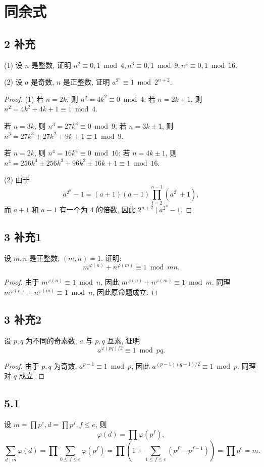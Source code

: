 \documentclass[12pt,a4paper,reqno]{amsart}
\theoremstyle{remark}
\renewcommand{\le}{\leqslant}
\begin{document}
\section{同余式}

\subsection*{2 补充}
(1) 设 $n$ 是整数, 证明 $n^2\equiv 0,1\bmod 4, n^3\equiv 0,1\bmod 9, n^4\equiv 0,1\bmod{16}$.

(2) 设 $a$ 是奇数, $n$ 是正整数, 证明 $a^{2^n}\equiv 1\bmod{2^{n+2}}$.
\begin{proof}
(1) 若 $n=2k$, 则 $n^2=4k^2\equiv 0\bmod 4$; 若 $n=2k+1$, 则 $n^2=4k^2+4k+1\equiv1\bmod 4$.

若 $n=3k$, 则 $n^3=27k^3\equiv0\bmod 9$; 若 $n=3k\pm 1$, 则 $n^3=27k^3\pm27k^2+9k\pm1\equiv 1\bmod9$.

若 $n=2k$, 则 $n^4=16k^4\equiv 0\bmod {16}$; 若 $n=4k\pm1$, 则 $n^4=256k^4\pm 256k^3+96k^2\pm 16k+1\equiv 1\bmod{16}$.

(2) 由于
  \[a^{2^n}-1=(a+1)(a-1)\prod_{i=2}^{n-1}(a^{2^i}+1),\]
而 $a+1$ 和 $a-1$ 有一个为 $4$ 的倍数, 因此 $2^{n+2}\mid a^{2^n}-1$.
\end{proof}

\subsection*{3 补充1}
设 $m,n$ 是正整数, $(m,n)=1$. 证明:
\[m^{\varphi(n)}+n^{\varphi(m)}\equiv1\bmod {mn}.\]
\begin{proof}
由于 $m^{\varphi(n)}\equiv1 \bmod n$, 因此 $m^{\varphi(n)}+n^{\varphi(m)}\equiv1\bmod m$. 同理 $m^{\varphi(n)}+n^{\varphi(m)}\equiv1\bmod n$, 因此原命题成立.
\end{proof}

\subsection*{3 补充2}
设 $p,q$ 为不同的奇素数, $a$ 与 $p,q$ 互素, 证明 \[a^{\varphi(pq)/2}\equiv1\bmod{pq}.\]
\begin{proof}
由于 $p,q$ 为奇数, $a^{p-1}\equiv 1\bmod p$, 因此 $a^{(p-1)(q-1)/2}\equiv 1\bmod p$. 同理对 $q$ 成立.
\end{proof}

\subsection*{5.1}
设 $m=\prod p^e, d=\prod p^f,f\le e$, 则
  \[ \varphi(d)=\prod\varphi(p^f), \]
  \[\sum_{d\mid m}\varphi(d)=\prod \sum_{0\le f\le e} \varphi(p^f)=\prod (1+\sum_{1\le f\le e} (p^f-p^{f-1}))=\prod p^e=m.\]
\end{document}
